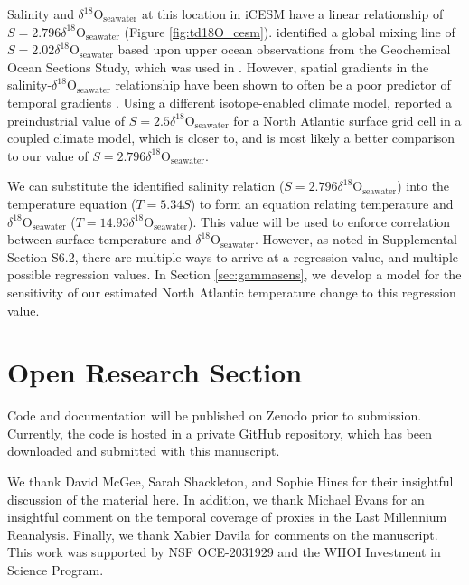 \documentclass[draft]{agujournal2019}
\begin{document}
Salinity and $\delta^{18}\mathrm{O}_{\mathrm{seawater}}$ at this location
in iCESM have a linear relationship of $S = 2.796 \delta^{18}\mathrm{O}_{\mathrm{seawater}}$
(Figure \ref{fig:td18O_cesm}).  identified
a global mixing line of
$S = 2.02 \delta^{18}\mathrm{O}_{\mathrm{seawater}}$ based upon upper ocean
observations from the Geochemical Ocean Sections Study, which was used
in . However, spatial gradients in the
salinity-$\delta^{18}\mathrm{O}_{\mathrm{seawater}}$ relationship have been
shown to often be a poor predictor of temporal gradients
\cite[]{Schmidt-1998:Oxygen, Schmidt-LeGrande-2007:Water}. Using a
different isotope-enabled climate model,
 reported a preindustrial value of
$S = 2.5 \delta^{18}\mathrm{O}_{\mathrm{seawater}}$ for a North Atlantic
surface grid cell in a coupled climate model, which is closer to, and
is most likely a better comparison to our value of
$S = 2.796 \delta^{18}\mathrm{O}_{\mathrm{seawater}}$.

We can substitute the identified salinity relation
($S = 2.796\delta^{18}\mathrm{O}_{\mathrm{seawater}}$) into the temperature
equation ($T = 5.34S$) to form an equation relating temperature and
$\delta^{18}\mathrm{O}_{\mathrm{seawater}}$
($T = 14.93 \delta^{18}\mathrm{O}_{\mathrm{seawater}}$). This value will be
used to enforce correlation between surface temperature and
$\delta^{18}\mathrm{O}_{\mathrm{seawater}}$. However,
as noted in Supplemental Section S6.2, there are
multiple ways to arrive at a regression value, and multiple possible
regression values. In Section \ref{sec:gammasens}, we develop a model
for the sensitivity of our estimated North Atlantic temperature change
to this regression value.

\section*{Open Research Section}
Code and documentation will be published on Zenodo prior to submission. Currently, the code is hosted in a private GitHub repository, which has been downloaded and submitted with this manuscript.

\acknowledgments
We thank David McGee, Sarah Shackleton, and Sophie Hines for their insightful discussion of the material here. In addition, we thank Michael Evans for an insightful comment on the temporal coverage of proxies in the Last Millennium Reanalysis. Finally, we thank Xabier Davila for comments on the manuscript. This work was supported by NSF OCE-2031929 and the WHOI Investment in Science Program.
\end{document}
